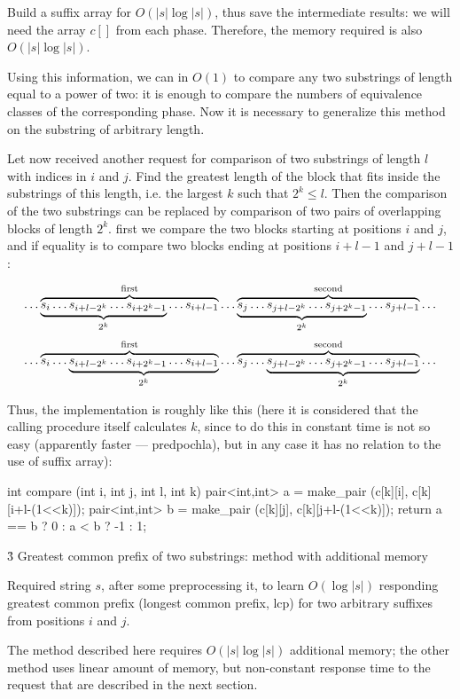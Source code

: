 Build a suffix array for $O (|s| \log |s|)$, thus save the intermediate results: we will need the array $c[]$ from each phase. Therefore, the memory required is also $O (|s| \log |s|)$.

Using this information, we can in $O(1)$ to compare any two substrings of length equal to a power of two: it is enough to compare the numbers of equivalence classes of the corresponding phase. Now it is necessary to generalize this method on the substring of arbitrary length.

Let now received another request for comparison of two substrings of length $l$ with indices in $i$ and $j$. Find the greatest length of the block that fits inside the substrings of this length, i.e. the largest $k$ such that $2^k \le l$. Then the comparison of the two substrings can be replaced by comparison of two pairs of overlapping blocks of length $2^k$. first we compare the two blocks starting at positions $i$ and $j$, and if equality is to compare two blocks ending at positions $i+l-1$ and $j+l-1$:

$$ \ldots \overbrace{ \underbrace{ s_i \ldots s_{i+l-2^k} \ldots s_{i+2^k-1} }_{2^k} \ldots s_{i+l-1} }^{\rm first} \ldots \overbrace{ \underbrace{ s_j \ldots s_{j+l-2^k} \ldots s_{j+2^k-1} }_{2^k} \ldots s_{j+l-1} }^{\rm second} \ldots $$
$$ \ldots \overbrace{ s_i \ldots \underbrace{ s_{i+l-2^k} \ldots s_{i+2^k-1} \ldots s_{i+l-1} }_{2^k} }^{\rm first} \ldots \overbrace{ s_j \ldots \underbrace{ s_{j+l-2^k} \ldots s_{j+2^k-1} \ldots s_{j+l-1} }_{2^k} }^{\rm second} \ldots $$

Thus, the implementation is roughly like this (here it is considered that the calling procedure itself calculates $k$, since to do this in constant time is not so easy (apparently faster --- predpochla), but in any case it has no relation to the use of suffix array):

\code
int compare (int i, int j, int l, int k) {
pair<int,int> a = make_pair (c[k][i], c[k][i+l-(1<<k)]);
pair<int,int> b = make_pair (c[k][j], c[k][j+l-(1<<k)]);
return a == b ? 0 : a < b ? -1 : 1;
}
\endcode


\h3{ Greatest common prefix of two substrings: method with additional memory }

Required string $s$, after some preprocessing it, to learn $O(\log |s|)$ responding greatest common prefix (longest common prefix, lcp) for two arbitrary suffixes from positions $i$ and $j$.

The method described here requires $O (|s| \log |s|)$ additional memory; the other method uses linear amount of memory, but non-constant response time to the request that are described in the next section.

